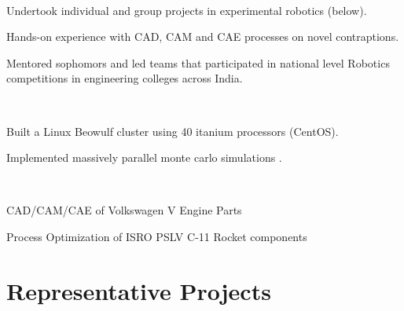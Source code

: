 \documentclass[]{deedy-resume-openfont}
\begin{document}
\begin{minipage}[t]{0.66\textwidth}
\\
\begin{tightemize}
\item Undertook individual and group projects in experimental robotics (below).
\item Hands-on experience with CAD, CAM and CAE processes on novel contraptions.
\item Mentored sophomors and led teams that participated in national level Robotics competitions in engineering colleges across India.
\end{tightemize}
\sectionsep


\\
\begin{tightemize}
\item Built a Linux Beowulf cluster using 40 itanium processors (CentOS).
\item Implemented massively parallel monte carlo simulations .
\end{tightemize}
\sectionsep


\\
\begin{tightemize}\item CAD/CAM/CAE of Volkswagen V Engine Parts
\item Process Optimization of ISRO PSLV C-11 Rocket components
\end{tightemize}
\sectionsep



\newcommand\Topstrut{\rule{0pt}{2.1ex}}
\newcommand\Bottomstrut{\rule[-0.6ex]{0pt}{0pt}}

\section{Representative Projects}
\begin{tabular}{rll}


\end{tabular}
\end{minipage}
\end{document}
